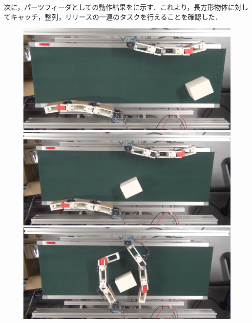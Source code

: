 \documentclass[a4paper,twoside,12pt,papersize, dvipdfmx]{iirthesis}
\begin{document}
次に，パーツフィーダとしての動作結果をに示す．これより，長方形物体に対してキャッチ，整列，リリースの一連のタスクを行えることを確認した．
\begin{figure}[hb]
\centering
\begin{minipage}{0.49\hsize}
\includegraphics[width=0.98\hsize]{fig/4-manipulation-result/Rectangle/3-1.jpg}
\subcaption{}
\end{minipage}\hfill
\begin{minipage}{0.49\hsize}
\includegraphics[width=0.98\hsize]{fig/4-manipulation-result/Rectangle/3-2.jpg}
\subcaption{}
\end{minipage}\hfill
\begin{minipage}{0.49\hsize}
\includegraphics[width=0.98\hsize]{fig/4-manipulation-result/Rectangle/3-3.jpg}

\end{minipage}
\end{figure}
\end{document}
